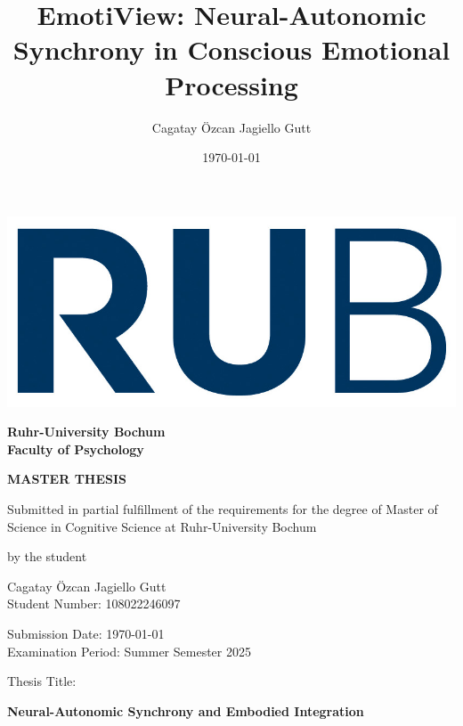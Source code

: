 \documentclass[
    12pt                %
]{article} %
\title{EmotiView: Neural-Autonomic Synchrony in Conscious Emotional Processing} %
\author{Cagatay Özcan Jagiello Gutt} %
\date{\today}
\begin{document}
\begin{titlepage}
    \begin{center}
        \begin{minipage}{0.2\textwidth}
            \includegraphics[width=1.5\textwidth]{../EV_images/rub.jpg} %
        \end{minipage}
        \hspace*{\fill}
        \begin{minipage}{0.6\textwidth}
            \hspace*{\fill}\textbf{Ruhr-University Bochum} \\ \hspace*{\fill}\textbf{Faculty of Psychology}
        \end{minipage}

        \vspace{2 cm}
        {\textbf{\large MASTER THESIS}}

        \vspace{0.2cm}
        Submitted in partial fulfillment of the requirements for the degree of Master of Science in Cognitive Science at Ruhr-University Bochum

        \vspace{0.5cm}
        by the student

        \vspace{0.5cm}
        Cagatay Özcan Jagiello Gutt\\
        Student Number: 108022246097

        \vspace{0.5cm}
        Submission Date: \today \\ %
        Examination Period: Summer Semester 2025 %

        \vspace{0.5cm}
        Thesis Title:

        \vspace{0.2cm}
        \textbf{Neural-Autonomic Synchrony and Embodied Integration}


\end{center}
\end{titlepage}
\end{document}
